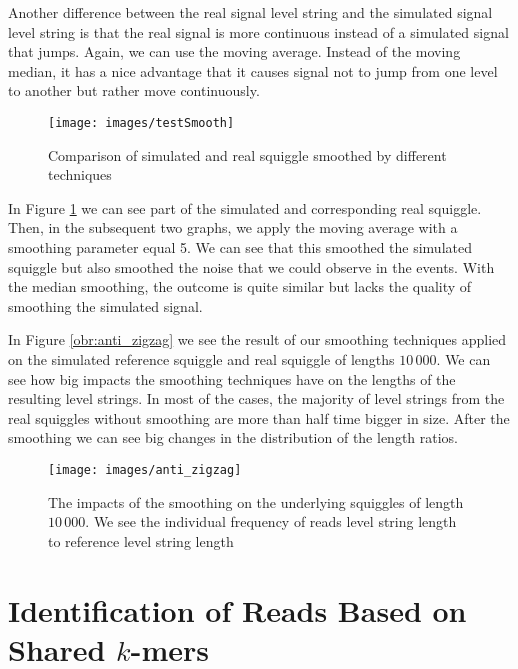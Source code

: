 Another difference between the real signal level string
and the simulated signal level string is that the real signal is more continuous instead
of a simulated signal that jumps. Again, we can use the moving average. Instead of
the moving median, it has a nice advantage that it causes signal not to jump from
one level to another but rather move continuously.

\begin{figure}
\centerline{\texttt{[image: images/testSmooth]}}
\caption[Hehe]{Comparison of simulated and real squiggle smoothed by different techniques}
\label{obr:testSmooth}
\end{figure}

In Figure \ref{obr:testSmooth} we can see part of the simulated and corresponding real squiggle.
Then, in the subsequent two graphs, we apply the moving average with a smoothing parameter
equal 5. We can see that this smoothed the simulated squiggle but also smoothed the noise
that we could observe in the events. With the median smoothing, the outcome is quite
similar but lacks the quality of smoothing the simulated signal.

In Figure \ref{obr:anti_zigzag} we see the result of our smoothing techniques
applied on the simulated reference squiggle and real squiggle of lengths $10\,000$. We can see how
big impacts the smoothing techniques have on the lengths of the resulting level strings.
In most of the cases, the majority of level strings from the real squiggles without smoothing
are more than half time bigger in size. After the smoothing we can see big changes in
the distribution of the length ratios.

\begin{figure}
\centerline{\texttt{[image: images/anti\_zigzag]}}
\caption[Hehe]{The impacts of the smoothing on the underlying squiggles of length $10\,000$. We see the individual 
frequency of reads level string length to reference level string length}
\label{images/anti_zigzag}
\end{figure}

\section{Identification of Reads Based on Shared $k$-mers}
\label{section:readIdentification}

